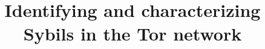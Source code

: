 \documentclass[letterpaper,twocolumn,10pt]{article}
\begin{document}
\title{\Large \bf Identifying and characterizing Sybils in the Tor network}

\author{}

\maketitle

\thispagestyle{empty}















% 

{\footnotesize\balance 
}

\newpage


\end{document}
